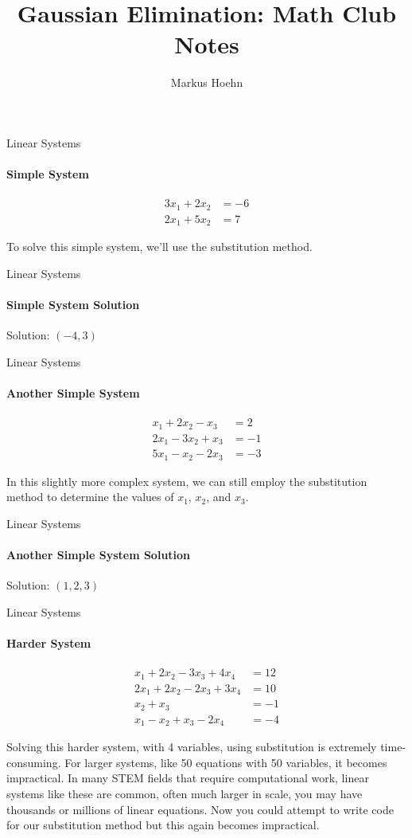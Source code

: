 \documentclass{beamer}
\title{Gaussian Elimination: Math Club Notes}
\author{Markus Hoehn}
\date{}
\begin{document}
\begin{frame}
    \titlepage
\end{frame}

\begin{frame}{Linear Systems}
\framesubtitle{Simple System}
\begin{align*}
    3x_1 + 2x_2 &= -6 \\
    2x_1 + 5x_2 &= 7
\end{align*}

To solve this simple system, we'll use the substitution method.
\end{frame}

\begin{frame}{Linear Systems}
\framesubtitle{Simple System Solution}
Solution: $(-4, 3)$
\end{frame}

\begin{frame}{Linear Systems}
\framesubtitle{Another Simple System}
\begin{align*}
    x_1 + 2x_2 - x_3 &= 2 \\
    2x_1 - 3x_2 + x_3 &= -1 \\
    5x_1 - x_2 - 2x_3 &= -3
\end{align*}

In this slightly more complex system, we can still employ the substitution method to determine the values of $x_1$, $x_2$, and $x_3$.
\end{frame}

\begin{frame}{Linear Systems}
\framesubtitle{Another Simple System Solution}
Solution: $(1, 2, 3)$
\end{frame}

\begin{frame}{Linear Systems}
\framesubtitle{Harder System}
\begin{align*}
    x_1 + 2x_2 - 3x_3 + 4x_4 &= 12 \\
    2x_1 + 2x_2 - 2x_3 + 3x_4 &= 10 \\
    x_2 + x_3 &= -1 \\
    x_1 - x_2 + x_3 - 2x_4 &= -4
\end{align*}

Solving this harder system, with 4 variables, using substitution is extremely time-consuming. For larger systems, like 50 equations with 50 variables, it becomes impractical. In many STEM fields that require computational work, linear systems like these are common, often much larger in scale, you may have thousands or millions of linear equations. Now you could attempt to write code for our substitution method but this again becomes impractical.

\end{frame}
\end{document}
